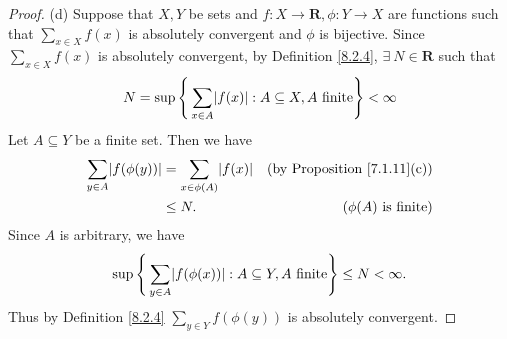 \begin{proof}{(d)}
    Suppose that \(X, Y\) be sets and \(f : X \to \mathbf{R}, \phi : Y \to X\) are functions such that \(\sum_{x \in X} f(x)\) is absolutely convergent and \(\phi\) is bijective.
    Since \(\sum_{x \in X} f(x)\) is absolutely convergent, by Definition \ref{8.2.4}, \(\exists\ N \in \mathbf{R}\) such that
    \[
        N = \sup\Bigg\{\sum_{x \in A} \abs*{f(x)} : A \subseteq X, A \text{ finite}\Bigg\} < \infty
    \]
    Let \(A \subseteq Y\) be a finite set.
    Then we have
    \begin{align*}
        \sum_{y \in A} \abs*{f(\phi(y))} & = \sum_{x \in \phi(A)} \abs*{f(x)} & \text{(by Proposition \ref{7.1.11}(c))} \\
        & \leq N. & \text{(\(\phi(A)\) is finite)}
    \end{align*}
    Since \(A\) is arbitrary, we have
    \[
        \sup\Bigg\{\sum_{y \in A} \abs*{f(\phi(x))} : A \subseteq Y, A \text{ finite}\Bigg\} \leq N < \infty.
    \]
    Thus by Definition \ref{8.2.4} \(\sum_{y \in Y} f(\phi(y))\) is absolutely convergent.


\end{proof}
